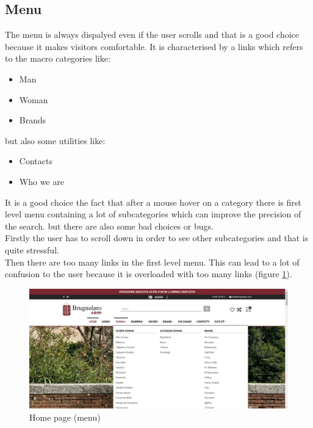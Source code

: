 \subsection{Menu}
\label{menu-section}
The menu is always dispalyed even if the user scrolls and that is
a good choice because it makes visitors comfortable.
It is characterised by a links which refers to the macro categories
like:
\begin{itemize}
    \item Man
    \item Woman
    \item Brands
\end{itemize}
but also some utilities like:
\begin{itemize}
    \item Contacts
    \item Who we are
\end{itemize}
It is a good choice the fact that after a mouse hover on a category
there is first level menu containing a lot of subcategories which can improve the precision of the
search. but there are also some bad choices or bugs.\\
Firstly the user
has to scroll down in order to see other subcategories and that is quite
stressful.\\
Then there are too many links in the first level menu.
This can lead to a lot of confusion to the user because it is overloaded
with too many links (figure \ref{home-page-menu}).
\begin{figure}[!h] 
    \centering 
    \includegraphics[scale = 0.29]{images/what_menu.png} 
    \caption{Home page (menu)}
    \label{home-page-menu}
\end{figure}
\newpage
